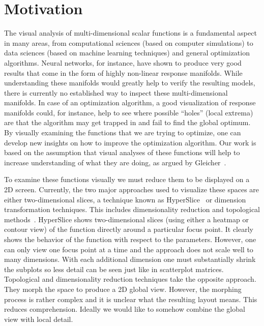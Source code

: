 \section{Motivation}\label{motivation}

The visual analysis of multi-dimensional scalar functions is a fundamental aspect in many areas, from computational sciences (based on computer simulations) to data sciences (based on machine learning techniques) and general optimization algorithms. 
Neural networks, for instance, have shown to produce very good results that come in the form of highly non-linear response manifolds.
While understanding these manifolds would greatly help to verify
the resulting models, there
is currently no established way to inspect these multi-dimensional manifolds. %
In case of an optimization algorithm, a good visualization of response manifolds could, for instance, help to see where possible
``holes'' (local extrema) are that the algorithm may get trapped in and fail to find the
global optimum. By visually examining the functions that we are trying to
optimize, one can develop new insights on how to improve the optimization
algorithm. Our work is based on the assumption that visual analyses of these functions will help to increase
understanding of what they are doing, 
as argued by Gleicher~\cite{gleicher:2016}.

To examine these functions visually we must reduce them to be
displayed on a 2D screen. 
Currently, the two major approaches used to visualize these spaces are either
two-dimensional slices, a technique known as HyperSlice~\cite{Wijk:1993} or dimension transformation techniques. This includes dimensionality
reduction and topological methods~\cite{Correa:2011,Carr:2003a}.  HyperSlice
shows two-dimensional slices (using either a heatmap or contour view)
of the function directly around a particular focus point. It clearly shows the
behavior of the function with respect to the parameters. However, one can only
view one focus point at a time and 
the approach does not scale well to many dimensions.
With each additional dimension one must substantially 
shrink the subplots so less detail can be seen just like in scatterplot matrices. Topological and dimensionality
reduction techniques take the opposite approach. They morph the space to
produce a 2D global view. However, the morphing process is rather
complex and it is unclear what the resulting layout means. This reduces
comprehension. Ideally we would like to somehow combine the global view with
local detail.

